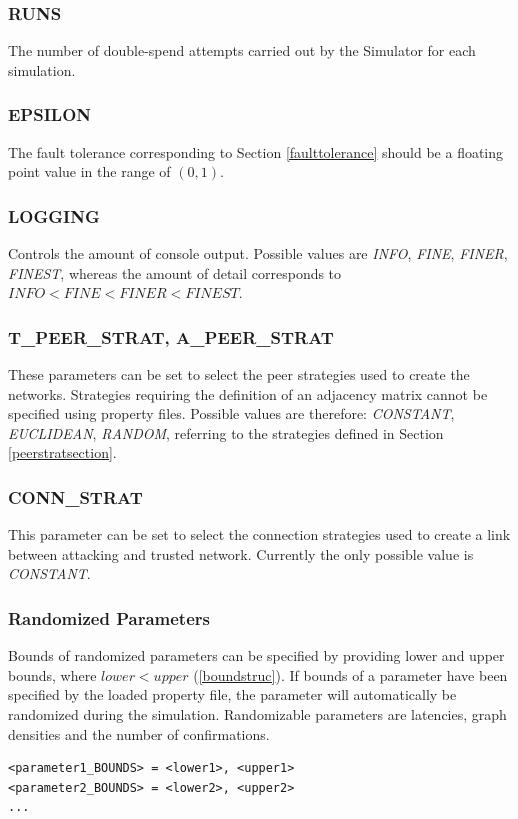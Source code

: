 \documentclass[a4paper,12pt,twoside]{report}
\begin{document}
\subsubsection{RUNS}
The number of double-spend attempts carried out by the Simulator for each simulation.
\subsubsection{EPSILON}
The fault tolerance corresponding to Section \ref{faulttolerance} should be a floating point value in the range of $(0, 1)$.
\subsubsection{LOGGING}
Controls the amount of console output. Possible values are \textit{INFO}, \textit{FINE}, \textit{FINER}, \textit{FINEST}, whereas the amount of detail corresponds to $\textit{INFO} < \textit{FINE} < \textit{FINER} < \textit{FINEST}$.
\subsubsection{T\_PEER\_STRAT, A\_PEER\_STRAT}
These parameters can be set to select the peer strategies used to create the networks. Strategies requiring the definition of an adjacency matrix cannot be specified using property files. Possible values are therefore: \textit{CONSTANT}, \textit{EUCLIDEAN}, \textit{RANDOM}, referring to the strategies defined in Section \ref{peerstratsection}.
\subsubsection{CONN\_STRAT}
This parameter can be set to select the connection strategies used to create a link between attacking and trusted network. Currently the only possible value is \textit{CONSTANT}.
\subsubsection{Randomized Parameters}
Bounds of randomized parameters can be specified by providing lower and upper bounds, where $lower < upper$ (\autoref{boundstruc}). If bounds of a parameter have been specified by the loaded property file, the parameter will automatically be randomized during the simulation. Randomizable parameters are latencies, graph densities and the number of confirmations.
\begin{lstlisting}[caption=Defining bounds of randomized parameters,label=boundstruc]
<parameter1_BOUNDS> = <lower1>, <upper1>
<parameter2_BOUNDS> = <lower2>, <upper2>
...
\end{lstlisting}
\end{document}
